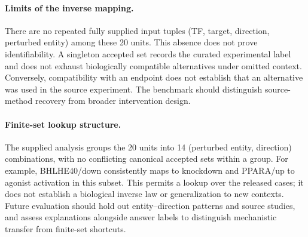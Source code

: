 \paragraph{Limits of the inverse mapping.} There are no repeated fully supplied input tuples (TF, target, direction, perturbed entity) among these 20 units. This absence does not prove identifiability. A singleton accepted set records the curated experimental label and does not exhaust biologically compatible alternatives under omitted context. Conversely, compatibility with an endpoint does not establish that an alternative was used in the source experiment. The benchmark should distinguish source-method recovery from broader intervention design.

\paragraph{Finite-set lookup structure.} The supplied analysis groups the 20 units into 14 (perturbed entity, direction) combinations, with no conflicting canonical accepted sets within a group. For example, BHLHE40/down consistently maps to knockdown and PPARA/up to agonist activation in this subset. This permits a lookup over the released cases; it does not establish a biological inverse law or generalization to new contexts. Future evaluation should hold out entity--direction patterns and source studies, and assess explanations alongside answer labels to distinguish mechanistic transfer from finite-set shortcuts.

\clearpage
